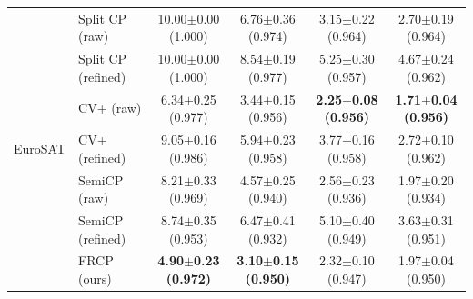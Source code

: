 \begin{table}[t]
\begin{tabular}{llcccc}
\midrule
\multirow{7}{*}{EuroSAT} & Split CP (raw) & 10.00$\pm$0.00 {\scriptsize(1.000)} & 6.76$\pm$0.36 {\scriptsize(0.974)} & 3.15$\pm$0.22 {\scriptsize(0.964)} & 2.70$\pm$0.19 {\scriptsize(0.964)}\\
 & Split CP (refined) & 10.00$\pm$0.00 {\scriptsize(1.000)} & 8.54$\pm$0.19 {\scriptsize(0.977)} & 5.25$\pm$0.30 {\scriptsize(0.957)} & 4.67$\pm$0.24 {\scriptsize(0.962)}\\
 & CV+ (raw) & 6.34$\pm$0.25 {\scriptsize(0.977)} & 3.44$\pm$0.15 {\scriptsize(0.956)} & \textbf{2.25$\pm$0.08 {\scriptsize(0.956)}} & \textbf{1.71$\pm$0.04 {\scriptsize(0.956)}}\\
 & CV+ (refined) & 9.05$\pm$0.16 {\scriptsize(0.986)} & 5.94$\pm$0.23 {\scriptsize(0.958)} & 3.77$\pm$0.16 {\scriptsize(0.958)} & 2.72$\pm$0.10 {\scriptsize(0.962)}\\
 & SemiCP (raw) & 8.21$\pm$0.33 {\scriptsize(0.969)} & 4.57$\pm$0.25 {\scriptsize(0.940)} & 2.56$\pm$0.23 {\scriptsize(0.936)} & 1.97$\pm$0.20 {\scriptsize(0.934)}\\
 & SemiCP (refined) & 8.74$\pm$0.35 {\scriptsize(0.953)} & 6.47$\pm$0.41 {\scriptsize(0.932)} & 5.10$\pm$0.40 {\scriptsize(0.949)} & 3.63$\pm$0.31 {\scriptsize(0.951)}\\
 & FRCP (ours) & \textbf{4.90$\pm$0.23 {\scriptsize(0.972)}} & \textbf{3.10$\pm$0.15 {\scriptsize(0.950)}} & 2.32$\pm$0.10 {\scriptsize(0.947)} & 1.97$\pm$0.04 {\scriptsize(0.950)}\\
\bottomrule
\end{tabular}
\end{table}
